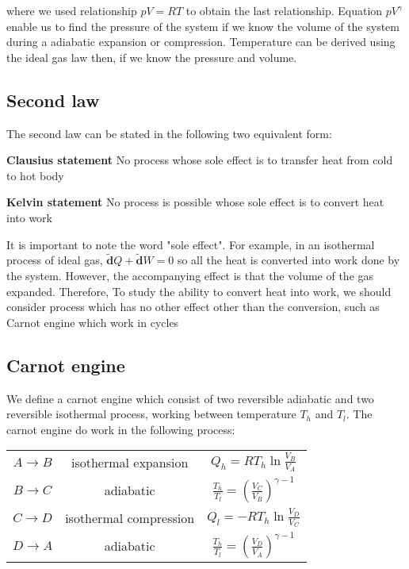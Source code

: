 \documentclass{article}
\newcommand{\dbar}{\mathbf{\tilde{d}}}
\begin{document}
where we used relationship $pV = RT$ to obtain the last relationship. Equation $p V^{\gamma}$ 
enable us to find the pressure of the system if we know the volume of the 
system during a adiabatic expansion or compression. Temperature can be derived using the ideal 
gas law then, if we know the pressure and volume.

\subsection{Second law}
The second law can be stated in the following two equivalent form:

\textbf{Clausius statement} No process whose sole effect is to transfer heat from cold to hot body

\textbf{Kelvin statement} No process is possible whose sole effect is to convert heat into work

It is important to note the word "sole effect". For example, in an isothermal process of ideal gas, 
$\dbar Q + \dbar W = 0$ so all the heat is converted into work done by the system. However, the 
accompanying effect is that the volume of the gas expanded. 
Therefore, To study the ability to convert heat into work, we should consider process which has no 
other effect other than the conversion, such as Carnot engine which work in cycles

\subsection{Carnot engine}
We define a carnot engine which consist of two reversible adiabatic and two reversible 
isothermal process, working between temperature $T_h$ and $T_l$. The carnot engine do work
in the following process:

\begin{table*}[h]
    \centering
    \begin{tabular}{ccc}
        $ A \to B $ & isothermal expansion & $Q_h = RT_h \ln \frac{V_B}{V_A}$ \\
        $ B \to C $ & adiabatic & $ \frac{T_h}{T_l} = \left( \frac{V_C}{V_B} \right) ^ {\gamma-1} $ \\
        $ C \to D $ & isothermal compression & $Q_l = - RT_h \ln \frac{V_D}{V_C}$ \\
        $ D \to A $ & adiabatic & $ \frac{T_h}{T_l} = \left( \frac{V_D}{V_A} \right) ^ {\gamma-1}$ \\
    \end{tabular}
\end{table*}
\end{document}
